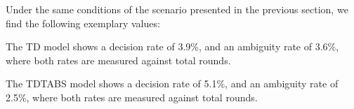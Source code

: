 \documentclass[11pt]{article}
\theoremstyle{plain}
\newcommand{\comment}[1]{}
\begin{document}
{Under the same conditions of the scenario presented in the previous section,
we find the following exemplary values:




The TD model shows a decision rate of 3.9\%, and an ambiguity rate of 3.6\%,
where both rates are measured against total rounds.

The TDTABS model shows a decision rate of 5.1\%, and an ambiguity rate of 2.5\%,
where both rates are measured against total rounds.









}
\end{document}
